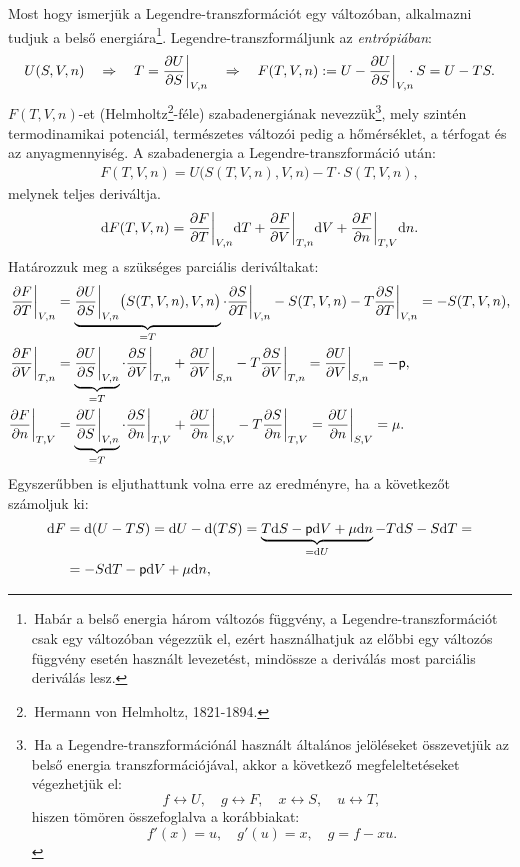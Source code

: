 Most hogy ismerjük a Legendre-transzformációt egy változóban, alkalmazni tudjuk a belső energiára\footnote{\,Habár a belső energia három változós függvény, a Legendre-transzformációt csak egy változóban végezzük el, ezért használhatjuk az előbbi egy változós függvény esetén használt levezetést, mindössze a deriválás most parciális deriválás lesz.}. Legendre-transzformáljunk az \emph{entrópiában}:
\begin{align}
	U(S,V,n)\follows T = \pd US\bigg|_{V,n} \follows F(T,V,n):= U - \pd US\bigg|_{V,n}\hspace{-2mm}\cdot S = U-TS.
\end{align}
$F(T,V,n)$-et (Helmholtz\footnote{\,Hermann von Helmholtz, 1821-1894.}-féle) szabadenergiának nevezzük\footnote{\,Ha a Legendre-transzformációnál használt általános jelöléseket összevetjük az belső energia transzformációjával, akkor a következő megfeleltetéseket végezhetjük el:
$$ f\leftrightarrow U,\quad g \leftrightarrow F, \quad x \leftrightarrow S,\quad u \leftrightarrow T,$$
hiszen tömören összefoglalva a korábbiakat:
$$f'(x)=u,\quad g'(u) = x,\quad g=f-xu.$$}, mely szintén termodinamikai potenciál, természetes változói pedig a hőmérséklet, a térfogat és az anyagmennyiség.
A szabadenergia a Legendre-transzformáció után:
\begin{align}
	F(T,V,n) = U\big(S(T,V,n),V,n\big) - T\cdot S(T,V,n),
\end{align}
melynek teljes deriváltja.
\begin{align}
\mathrm{d}F(T,V,n) = \frac{\partial{F}}{\partial{T}}\bigg|_{V,n}\mathrm{d}T + \frac{\partial{F}}{\partial{V}} \bigg|_{T,n} \mathrm{d}V + \frac{\partial{F}}{\partial{n}}\bigg|_{T,V}\mathrm{d}n.
\end{align}
Határozzuk meg a szükséges parciális deriváltakat:
\begin{align}
	\frac{\partial{F}}{\partial{T}}\bigg|_{V,n} &= \underbrace{\frac{\partial{U}}{\partial{S}}\bigg|_{V,n}\big(S(T,V,n),V,n\big)}_{=T}\cdot \frac{\partial{S}}{\partial{T}}\bigg|_{V,n}-S(T,V,n)- T\frac{\partial{S}}{\partial{T}}\bigg|_{V,n} = -S(T,V,n),\\
	\frac{\partial{F}}{\partial{V}}\bigg|_{T,n} &= \underbrace{\frac{\partial{U}}{\partial{S}}\bigg|_{V,n}}_{=T}\cdot \frac{\partial{S}}{\partial{V}}\bigg|_{T,n}+\frac{\partial{U}}{\partial{V}}\bigg|_{S,n}-T\frac{\partial{S}}{\partial{V}}\bigg|_{T,n} = \frac{\partial{U}}{\partial{V}}\bigg|_{S,n} = -\mathsf p,\\
	\frac{\partial{F}}{\partial{n}}\bigg|_{T,V} &= \underbrace{\frac{\partial{U}}{\partial{S}}\bigg|_{V,n}}_{=T}\cdot \frac{\partial{S}}{\partial{n}}\bigg|_{T,V}+\frac{\partial{U}}{\partial{n}}\bigg|_{S,V}- T\frac{\partial{S}}{\partial{n}}\bigg|_{T,V} = \frac{\partial{U}}{\partial{n}}\bigg|_{S,V} = \mu.
\end{align}
Egyszerűbben is eljuthattunk volna erre az eredményre, ha a következőt számoljuk ki:
\begin{align}
\begin{split}
	\mathrm{d}F &= \mathrm{d}(U-TS) = \mathrm{d}U -\mathrm{d}(TS) = \underbrace{T\mathrm{d}S-\mathsf p\mathrm{d}V+\mu\mathrm{d}n}_{= \mathrm{d}U} - T\mathrm{d}S-S\mathrm{d}T = \\
	&= -S\mathrm{d}T-\mathsf p\mathrm{d}V+\mu \mathrm{d}n,
\end{split}
\end{align}

